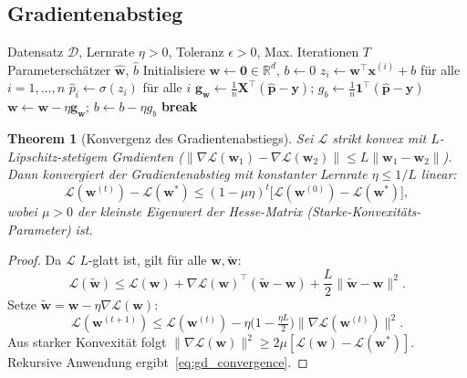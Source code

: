 ﻿\documentclass[12pt, a4paper]{article}
\newtheorem{theorem}{Theorem}[section]
\theoremstyle{definition}
\theoremstyle{remark}
\newcommand{\R}{\mathbb{R}}
\newcommand{\sigmoid}{\sigma}
\newcommand{\vw}{\bm{w}}
\newcommand{\vx}{\bm{x}}
\newcommand{\vy}{\bm{y}}
\newcommand{\vX}{\bm{X}}
\newcommand{\vp}{\hat{\bm{p}}}
\newcommand{\T}{\top}
\begin{document}
\subsection{Gradientenabstieg}

\begin{algorithm}[H]
  \caption{Batch-Gradientenabstieg für logistische Regression}
  \label{alg:gd}
  \begin{algorithmic}[1]
    \Require Datensatz $\mathcal{D}$, Lernrate $\eta > 0$, Toleranz $\epsilon > 0$, Max. Iterationen $T$
    \Ensure Parameterschätzer $\hat{\vw}$, $\hat{b}$
    \State Initialisiere $\vw \leftarrow \mathbf{0} \in \R^d$, $b \leftarrow 0$
      \State $z_i \leftarrow \vw^\T\vx^{(i)}+b$ für alle $i = 1,\ldots,n$
      \State $\hat{p}_i \leftarrow \sigmoid(z_i)$ für alle $i$
      \State $\mathbf{g}_{\vw} \leftarrow \frac{1}{n}\vX^\T(\vp-\vy)$; \quad $g_b \leftarrow \frac{1}{n}\mathbf{1}^\T(\vp-\vy)$
      \State $\vw \leftarrow \vw - \eta \mathbf{g}_{\vw}$; \quad $b \leftarrow b - \eta g_b$
      \If{$\|\mathbf{g}_{\vw}\|_2 < \epsilon$} \textbf{break} \EndIf
    \EndFor
  \end{algorithmic}
\end{algorithm}

\begin{theorem}[Konvergenz des Gradientenabstiegs]
  \label{thm:gd_convergence}
  Sei $\mathcal{L}$ strikt konvex mit $L$-Lipschitz-stetigem Gradienten
  ($\|\nabla\mathcal{L}(\vw_1)-\nabla\mathcal{L}(\vw_2)\|\leq L\|\vw_1-\vw_2\|$).
  Dann konvergiert der Gradientenabstieg mit konstanter Lernrate $\eta \leq 1/L$ linear:
  \begin{equation}
    \mathcal{L}(\vw^{(t)}) - \mathcal{L}(\vw^*) \leq (1-\mu\eta)^t \bigl[\mathcal{L}(\vw^{(0)}) - \mathcal{L}(\vw^*)\bigr],
    \label{eq:gd_convergence}
  \end{equation}
  wobei $\mu > 0$ der kleinste Eigenwert der Hesse-Matrix (Starke-Konvexitäts-Parameter) ist.
\end{theorem}

\begin{proof}
  Da $\mathcal{L}$ $L$-glatt ist, gilt für alle $\vw, \tilde{\vw}$:
  \[
    \mathcal{L}(\tilde{\vw}) \leq \mathcal{L}(\vw) + \nabla\mathcal{L}(\vw)^\T(\tilde{\vw}-\vw)
    + \frac{L}{2}\|\tilde{\vw}-\vw\|^2.
  \]
  Setze $\tilde{\vw} = \vw - \eta\nabla\mathcal{L}(\vw)$:
  \[
    \mathcal{L}(\vw^{(t+1)}) \leq \mathcal{L}(\vw^{(t)}) - \eta\bigl(1-\tfrac{\eta L}{2}\bigr)
    \|\nabla\mathcal{L}(\vw^{(t)})\|^2.
  \]
  Aus starker Konvexität folgt $\|\nabla\mathcal{L}(\vw)\|^2 \geq 2\mu[\mathcal{L}(\vw)-\mathcal{L}(\vw^*)]$.
  Rekursive Anwendung ergibt~\eqref{eq:gd_convergence}. 
\end{proof}
\end{document}
